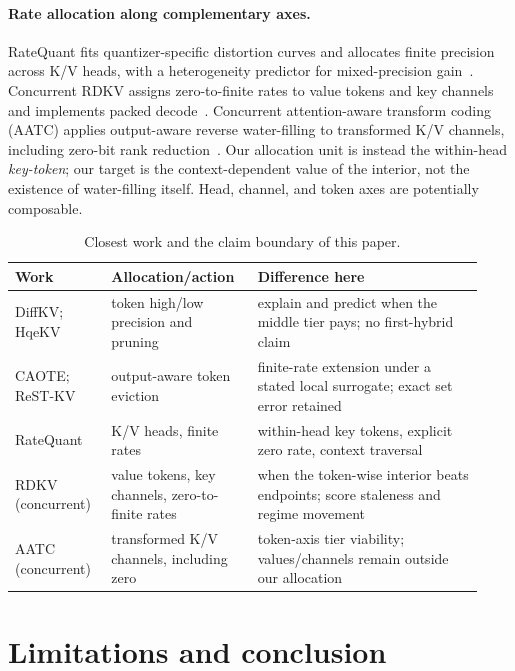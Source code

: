 \documentclass{article}
\theoremstyle{definition}
\begin{document}
\paragraph{Rate allocation along complementary axes.}
RateQuant fits quantizer-specific distortion curves and allocates finite precision across K/V heads, with a heterogeneity predictor for mixed-precision gain~\citep{zuo2026ratequant}.  Concurrent RDKV assigns zero-to-finite rates to value tokens and key channels and implements packed decode~\citep{zhang2026rdkv}.  Concurrent attention-aware transform coding (AATC) applies output-aware reverse water-filling to transformed K/V channels, including zero-bit rank reduction~\citep{laus2026aatc}.  Our allocation unit is instead the within-head \emph{key-token}; our target is the context-dependent value of the interior, not the existence of water-filling itself.  Head, channel, and token axes are potentially composable.

\begin{table}[t]
\centering
\footnotesize
\setlength{\tabcolsep}{3pt}
\caption{Closest work and the claim boundary of this paper.}
\label{tab:related}
\begin{tabular}{@{}p{0.19\linewidth}p{0.29\linewidth}p{0.45\linewidth}@{}}
\toprule
\textbf{Work} & \textbf{Allocation/action} & \textbf{Difference here} \\
\midrule
DiffKV; HqeKV & token high/low precision and pruning & explain and predict when the middle tier pays; no first-hybrid claim \\
CAOTE; ReST-KV & output-aware token eviction & finite-rate extension under a stated local surrogate; exact set error retained \\
RateQuant & K/V heads, finite rates & within-head key tokens, explicit zero rate, context traversal \\
RDKV (concurrent) & value tokens, key channels, zero-to-finite rates & when the token-wise interior beats endpoints; score staleness and regime movement \\
AATC (concurrent) & transformed K/V channels, including zero & token-axis tier viability; values/channels remain outside our allocation \\
\bottomrule
\end{tabular}
\vspace{-2mm}
\end{table}

\section{Limitations and conclusion}
\label{sec:conclusion}
\end{document}
